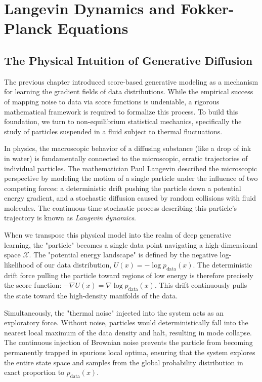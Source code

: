 \chapter{Langevin Dynamics and Fokker-Planck Equations}
\label{ch:langevin}

\section{The Physical Intuition of Generative Diffusion}

The previous chapter introduced score-based generative modeling as a mechanism for learning the gradient fields of data distributions. While the empirical success of mapping noise to data via score functions is undeniable, a rigorous mathematical framework is required to formalize this process. To build this foundation, we turn to non-equilibrium statistical mechanics, specifically the study of particles suspended in a fluid subject to thermal fluctuations.

In physics, the macroscopic behavior of a diffusing substance (like a drop of ink in water) is fundamentally connected to the microscopic, erratic trajectories of individual particles. The mathematician Paul Langevin described the microscopic perspective by modeling the motion of a single particle under the influence of two competing forces: a deterministic drift pushing the particle down a potential energy gradient, and a stochastic diffusion caused by random collisions with fluid molecules. The continuous-time stochastic process describing this particle's trajectory is known as \emph{Langevin dynamics}.

When we transpose this physical model into the realm of deep generative learning, the "particle" becomes a single data point navigating a high-dimensional space $\mathcal{X}$. The "potential energy landscape" is defined by the negative log-likelihood of our data distribution, $U(x) = -\log p_{\text{data}}(x)$. The deterministic drift force pulling the particle toward regions of low energy is therefore precisely the score function: $-\nabla U(x) = \nabla \log p_{\text{data}}(x)$. This drift continuously pulls the state toward the high-density manifolds of the data. 

Simultaneously, the "thermal noise" injected into the system acts as an exploratory force. Without noise, particles would deterministically fall into the nearest local maximum of the data density and halt, resulting in mode collapse. The continuous injection of Brownian noise prevents the particle from becoming permanently trapped in spurious local optima, ensuring that the system explores the entire state space and samples from the global probability distribution in exact proportion to $p_{\text{data}}(x)$.

